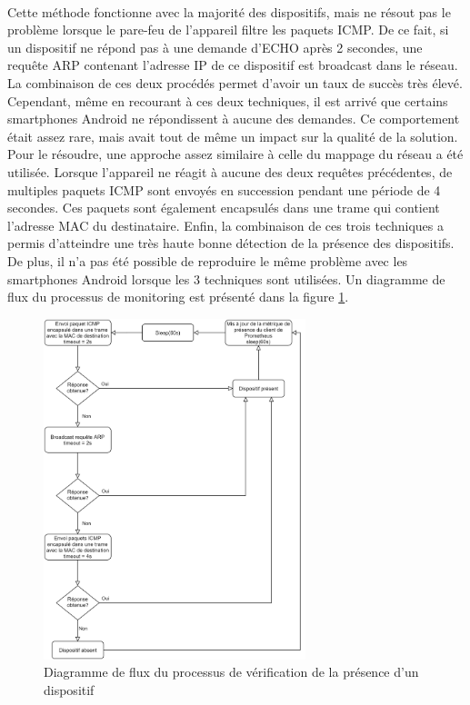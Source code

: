 ~

\noindent
Cette méthode fonctionne avec la majorité des dispositifs, mais ne résout pas le problème lorsque le pare-feu de l'appareil filtre les paquets ICMP. De ce fait, si un dispositif ne répond pas à une demande d'ECHO après 2 secondes, une requête ARP contenant l'adresse IP de ce dispositif est broadcast dans le réseau. La combinaison de ces deux procédés permet d'avoir un taux de succès très élevé. Cependant, même en recourant à ces deux techniques, il est arrivé que certains smartphones Android ne répondissent à aucune des demandes. Ce comportement était assez rare, mais avait tout de même un impact sur la qualité de la solution. Pour le résoudre, une approche assez similaire à celle du mappage du réseau a été utilisée. Lorsque l'appareil ne réagit à aucune des deux requêtes précédentes, de multiples paquets ICMP sont envoyés en succession pendant une période de 4 secondes. Ces paquets sont également encapsulés dans une trame qui contient l'adresse MAC du destinataire. Enfin, la combinaison de ces trois techniques a permis d'atteindre une très haute bonne détection de la présence des dispositifs. De plus, il n'a pas été possible de reproduire le même problème avec les smartphones Android lorsque les 3 techniques sont utilisées. Un diagramme de flux du processus de monitoring est présenté dans la figure \ref{fig:device_presence}.

\begin{figure}[ht!]
  \centering
  \includegraphics[width=0.68\textwidth]{img/app/device_mon.png}
  \caption{Diagramme de flux du processus de vérification de la présence d'un dispositif}
  \label{fig:device_presence}
\end{figure}
~

